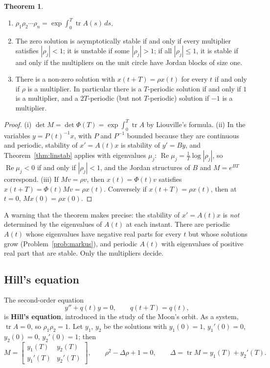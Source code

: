 \documentclass[11pt,a4paper]{article}
\numberwithin{equation}{section}
\DeclareMathOperator{\tr}{tr}
\DeclareMathOperator{\Real}{Re}
\theoremstyle{definition}
\newtheorem{thm}{Theorem}[subsection]
\begin{document}
\begin{thm}
\label{thm:floquetstab}
\begin{enumerate}[label=(\roman*)]
\item $\rho_1\rho_2\cdots\rho_n = \exp\int_0^T\tr A(s)\,ds$.
\item The zero solution is asymptotically stable if and only if every multiplier satisfies $|\rho_j| < 1$; it is unstable if some $|\rho_j| > 1$; if all $|\rho_j| \leq 1$, it is stable if and only if the
multipliers on the unit circle have Jordan blocks of size one.
\item There is a non-zero solution with $x(t + T) = \rho x(t)$ for every $t$ if and only if $\rho$ is a multiplier. In particular there is a $T$-periodic solution if and only if $1$ is a
multiplier, and a $2T$-periodic (but not $T$-periodic) solution if $-1$ is a multiplier.
\end{enumerate}
\end{thm}

\begin{proof}
(i) $\det M = \det\Phi(T) = \exp\int_0^T\tr A$ by Liouville's formula. (ii) In the variables $y = P(t)^{-1}x$, with $P$ and $P^{-1}$ bounded because they are continuous and periodic, stability of
$x' = A(t)x$ is stability of $y' = By$, and Theorem~\ref{thm:linstab} applies with eigenvalues $\mu_j$: $\Real\mu_j = \frac1T\log|\rho_j|$, so $\Real\mu_j < 0$ if and only if $|\rho_j| < 1$, and the Jordan structures of $B$
and $M = e^{BT}$ correspond. (iii) If $Mv = \rho v$, then $x(t) = \Phi(t)v$ satisfies $x(t + T) = \Phi(t)Mv = \rho x(t)$. Conversely if $x(t + T) = \rho x(t)$, then at $t = 0$, $Mx(0) = \rho x(0)$.
\end{proof}

A warning that the theorem makes precise: the stability of $x' = A(t)x$ is \emph{not} determined by the eigenvalues of $A(t)$ at each instant. There are periodic $A(t)$ whose eigenvalues
have negative real parts for every $t$ but whose solutions grow (Problem~\ref{prob:markus}), and periodic $A(t)$ with eigenvalues of positive real part that are stable. Only the
multipliers decide.

\subsection{Hill's equation}
\label{ssec:hill}

The second-order equation
\[
y'' + q(t)y = 0, \qquad q(t + T) = q(t),
\]
is \textbf{Hill's equation}, introduced in the study of the Moon's orbit. As a system, $\tr A = 0$, so $\rho_1\rho_2 = 1$. Let $y_1$, $y_2$ be the solutions with $y_1(0) = 1$, $y_1'(0) = 0$, $y_2(0) = 0$, $y_2'(0) = 1$; then
\[
M = \begin{bmatrix} y_1(T) & y_2(T)\\ y_1'(T) & y_2'(T)\end{bmatrix}, \qquad \rho^2 - \Delta\rho + 1 = 0, \qquad \Delta = \tr M = y_1(T) + y_2'(T) .
\]
\end{document}
